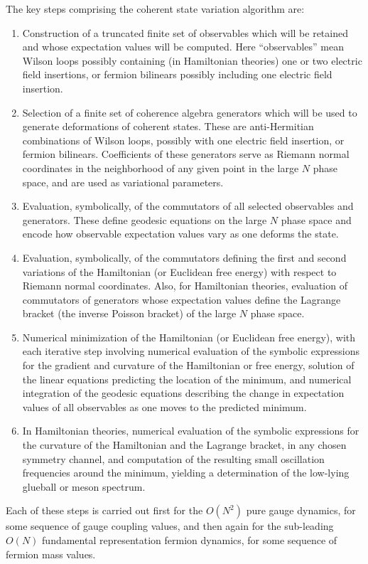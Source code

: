 \documentclass [12pt]{article}
\begin{document}
The key steps comprising the coherent state variation algorithm
\cite {CSVAII} are:
\begin{enumerate}\advance\itemsep -4pt
\item
    Construction of a truncated finite set of observables 
    which will be retained and whose expectation values will be computed.
    Here ``observables'' mean Wilson loops possibly containing
    (in Hamiltonian theories) one or two electric field insertions,
    or fermion bilinears possibly including one electric field insertion.
\item
    Selection of a finite set of coherence algebra generators
    which will be used to generate deformations of coherent states.
    These are anti-Hermitian combinations of Wilson loops,
    possibly with one electric field insertion, or fermion bilinears.
    Coefficients of these generators serve as Riemann normal coordinates
    in the neighborhood of any given point
    in the large $N$ phase space, and are used as variational parameters.
\item
    Evaluation, symbolically, of the commutators of all selected observables
    and generators.  These define geodesic equations
    on the large $N$ phase space and encode how observable expectation
    values vary as one deforms the state.
\item
    Evaluation, symbolically, of the commutators defining the first and second
    variations of the Hamiltonian (or Euclidean free energy) with respect
    to Riemann normal coordinates.
    Also, for Hamiltonian theories,
    evaluation of commutators of generators whose expectation values
    define the Lagrange bracket (the inverse Poisson bracket)
    of the large $N$ phase space.
\item
    Numerical minimization of the Hamiltonian (or Euclidean
    free energy), with each iterative step
    involving numerical evaluation of the symbolic expressions
    for the gradient and curvature of the Hamiltonian or free energy,
    solution of the linear equations predicting the location of the minimum,
    and numerical integration of the geodesic equations describing
    the change in expectation values of all observables as one moves
    to the predicted minimum.
\item
    In Hamiltonian theories,
    numerical evaluation of the symbolic expressions for the curvature of the
    Hamiltonian and the Lagrange bracket, in any chosen symmetry channel,
    and computation of the resulting
    small oscillation frequencies around the minimum,
    yielding a determination of the
    low-lying glueball or meson spectrum.
\end{enumerate}
%
Each of these steps is carried out first for the $O(N^2)$ pure gauge dynamics,
for some sequence of gauge coupling values,
and then again for the sub-leading $O(N)$ fundamental representation
fermion dynamics, for some sequence of fermion mass values.
\end{document}
